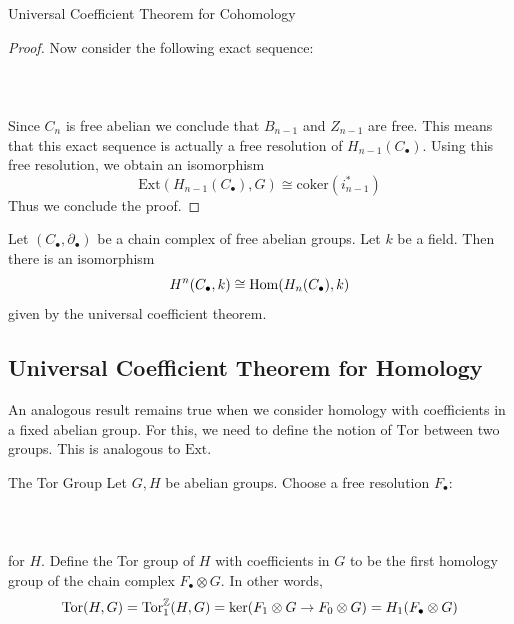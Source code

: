 \documentclass[a4paper]{article}
\begin{document}
\begin{thm}{Universal Coefficient Theorem for Cohomology}{}
\begin{proof}
Now consider the following exact sequence: \\~\\
\\~\\
Since $C_n$ is free abelian we conclude that $B_{n-1}$ and $Z_{n-1}$ are free. This means that this exact sequence is actually a free resolution of $H_{n-1}(C_\bullet)$. Using this free resolution, we obtain an isomorphism $$\text{Ext}(H_{n-1}(C_\bullet),G)\cong\text{coker}(i_{n-1}^\ast)$$ Thus we conclude the proof. 
\end{proof}
\end{thm}

\begin{crl}{}{} Let $(C_\bullet,\partial_\bullet)$ be a chain complex of free abelian groups. Let $k$ be a field. Then there is an isomorphism $$H^n(C_\bullet,k)\cong\operatorname{Hom}(H_n(C_\bullet),k)$$ given by the universal coefficient theorem. 
\end{crl}

\subsection{Universal Coefficient Theorem for Homology}
An analogous result remains true when we consider homology with coefficients in a fixed abelian group. For this, we need to define the notion of $\text{Tor}$ between two groups. This is analogous to $\text{Ext}$. 

\begin{defn}{The Tor Group}{} Let $G,H$ be abelian groups. Choose a free resolution $F_\bullet$: \\~\\
\\~\\
for $H$. Define the Tor group of $H$ with coefficients in $G$ to be the first homology group of the chain complex $F_\bullet\otimes G$. In other words, $$\text{Tor}(H,G)=\text{Tor}_1^{\mathbb{Z}}(H,G)=\ker(F_1\otimes G\to F_0\otimes G)=H_1(F_\bullet\otimes G)$$
\end{defn}
\end{document}
